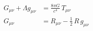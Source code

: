 \documentclass[aspectratio=169]{beamer}
\begin{document}
\begin{wallpaperframe}
\begin{align*}
G_{\mu\nu} + \Lambda g_{\mu\nu} &= \frac{8\pi G}{c^4}\,T_{\mu\nu} \\[6pt]
G_{\mu\nu} &= R_{\mu\nu} - \tfrac{1}{2}\,R\,g_{\mu\nu}
\end{align*}
\end{wallpaperframe}
\end{document}
